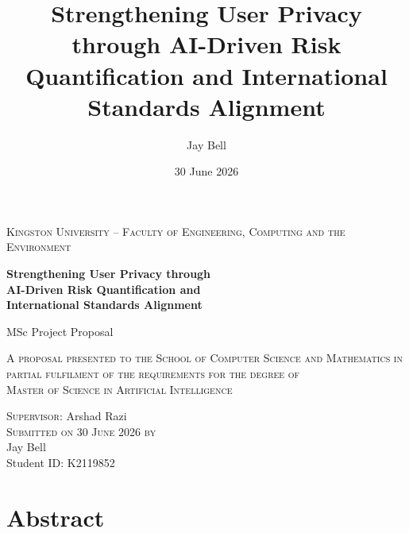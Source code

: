 \documentclass[12pt,a4paper,titlepage]{article}
\title{Strengthening User Privacy through AI-Driven Risk Quantification and International Standards Alignment}
\author{Jay Bell}
\date{30 June 2026}
\begin{document}

\begin{titlepage}
    \begin{center}
        \par
        \vspace*{1.5cm}
        {\large \textsc{Kingston University -- Faculty of Engineering, Computing and the Environment}}
        \par
        \vspace{2.5cm}
        {\LARGE \textbf{Strengthening User Privacy through\\[0.4em]
        AI-Driven Risk Quantification and\\[0.4em]
        International Standards Alignment}}
        \par
        \vspace{1.5cm}
        {\large MSc Project Proposal}
        \par
        \vspace{3cm}
        {\textsc{A proposal presented to the School of Computer Science and Mathematics in partial fulfilment of the requirements for the degree of}}\\[0.6em]
        {\textsc{Master of Science in Artificial Intelligence}}
        \par
        \vspace{3cm}
        {\textsc{Supervisor:} Arshad Razi}\\[0.4em]
        \vspace{1cm}
        {\textsc{Submitted on 30 June 2026 by}\\[0.3em]
        Jay Bell\\[0.2em]
        Student ID: K2119852}\\
    \end{center}
\end{titlepage}
\thispagestyle{empty}

\newpage
\tableofcontents
\newpage
\listoffigures
{}
\newpage
\listoftables
{}
\newpage

\cleardoublepage
{}
\setcounter{page}{1}

\section*{Abstract}
\end{document}
